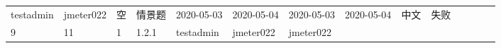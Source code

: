 \documentclass[hyperref, a4paper]{ctexart}
\begin{document}
\begin{longtable}[]{@{}llllllllllllll@{}}
\begin{minipage}[t]{0.04\columnwidth}
testadmin\strut
\end{minipage} & \begin{minipage}[t]{0.04\columnwidth}\raggedright
jmeter022\strut
\end{minipage} & \begin{minipage}[t]{0.04\columnwidth}\raggedright
空\strut
\end{minipage} & \begin{minipage}[t]{0.02\columnwidth}\raggedright
情景题\strut
\end{minipage} & \begin{minipage}[t]{0.04\columnwidth}\raggedright
2020-05-03\strut
\end{minipage} & \begin{minipage}[t]{0.05\columnwidth}\raggedright
2020-05-04\strut
\end{minipage} & \begin{minipage}[t]{0.07\columnwidth}\raggedright
2020-05-03\strut
\end{minipage} & \begin{minipage}[t]{0.08\columnwidth}\raggedright
2020-05-04\strut
\end{minipage} & \begin{minipage}[t]{0.04\columnwidth}\raggedright
中文\strut
\end{minipage} & \begin{minipage}[t]{0.02\columnwidth}\raggedright
失败\strut
\end{minipage}\tabularnewline
\begin{minipage}[t]{0.01\columnwidth}\raggedright
9\strut
\end{minipage} & \begin{minipage}[t]{0.12\columnwidth}\raggedright
11\strut
\end{minipage} & \begin{minipage}[t]{0.03\columnwidth}\raggedright
1\strut
\end{minipage} & \begin{minipage}[t]{0.06\columnwidth}\raggedright
1.2.1\strut
\end{minipage} & \begin{minipage}[t]{0.04\columnwidth}\raggedright
testadmin\strut
\end{minipage} & \begin{minipage}[t]{0.04\columnwidth}\raggedright
jmeter022\strut
\end{minipage} & \begin{minipage}[t]{0.04\columnwidth}\raggedright
jmeter022\strut
\end{minipage} & \begin{minipage}[t]{0.02\columnwidth}\raggedright

\end{minipage}
\end{longtable}
\end{document}
